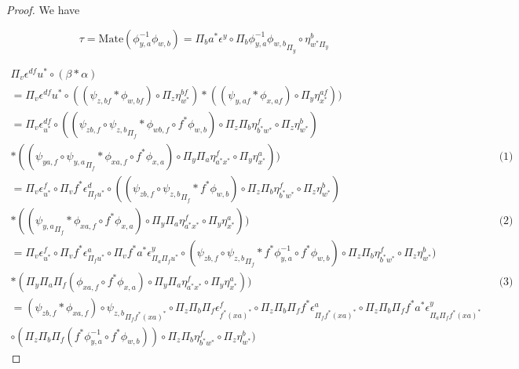 \documentclass[10pt, oneside]{article}
\begin{document}
\begin{proof}
    We have

    $$\tau = \mathrm{Mate}(\phi_{y, a}^{-1} \phi_{w, b}) = \Pi_b a^\ast \epsilon^y \circ \Pi_b {\phi_{y, a}^{-1} \phi_{w, b}}_{\Pi_y} \circ \eta^b_{w^\ast \Pi_y}$$

    \begin{align*}
        \Pi_v \epsilon^{df} u^\ast \circ (\beta \ast \alpha)
        \\ = \Pi_v \epsilon^{df} u^\ast \circ ((\psi_{z, bf} \ast \phi_{w, bf}) \circ \Pi_z \eta^{bf}_{w^\ast}) \ast ((\psi_{y, af} \ast \phi_{x, af}) \circ \Pi_y \eta^{af}_{x^\ast}))
        \\ = \Pi_v \epsilon^{df}_{u^\ast} \circ ((\psi_{zb, f} \circ {\psi_{z, b}}_{\Pi_f} \ast \phi_{wb, f} \circ f^\ast \phi_{w, b}) \circ \Pi_z \Pi_b \eta^f_{b^\ast w^\ast} \circ \Pi_z \eta^b_{w^\ast})
        \\ \ast ((\psi_{ya, f} \circ {\psi_{y, a}}_{\Pi_f} \ast \phi_{xa, f} \circ f^\ast \phi_{x, a}) \circ \Pi_y \Pi_a \eta^f_{a^\ast x^\ast} \circ \Pi_y \eta^{a}_{x^\ast})) && \text{(1)}
        \\ = \Pi_v \epsilon^f_{u^\ast} \circ \Pi_v f^\ast \epsilon^d_{\Pi_f u^\ast} \circ ((\psi_{zb, f} \circ {\psi_{z, b}}_{\Pi_f} \ast f^\ast \phi_{w, b}) \circ \Pi_z \Pi_b \eta^f_{b^\ast w^\ast} \circ \Pi_z \eta^b_{w^\ast})
        \\ \ast (({\psi_{y, a}}_{\Pi_f} \ast \phi_{xa, f} \circ f^\ast \phi_{x, a}) \circ \Pi_y \Pi_a \eta^f_{a^\ast x^\ast} \circ \Pi_y \eta^{a}_{x^\ast})) && \text{(2)}
        \\ = \Pi_v \epsilon^f_{u^\ast} \circ \Pi_v f^\ast \epsilon^a_{\Pi_f u^\ast} \circ \Pi_v f^\ast a^\ast \epsilon^y_{\Pi_ a\Pi_f u^\ast} \circ (\psi_{zb, f} \circ {\psi_{z, b}}_{\Pi_f} \ast f^\ast \phi^{-1}_{y, a} \circ f^\ast \phi_{w, b}) \circ \Pi_z \Pi_b \eta^f_{b^\ast w^\ast} \circ \Pi_z \eta^b_{w^\ast})
        \\ \ast (\Pi_y \Pi_a \Pi_f (\phi_{xa, f} \circ f^\ast \phi_{x, a}) \circ \Pi_y \Pi_a \eta^f_{a^\ast x^\ast} \circ \Pi_y \eta^{a}_{x^\ast})) && \text{(3)}
        \\ = (\psi_{zb, f} \ast \phi_{xa, f}) \circ {\psi_{z, b}}_{\Pi_f f^\ast (xa)^\ast} \circ \Pi_z \Pi_b \Pi_f \epsilon^f_{f^\ast (xa)^\ast} \circ \Pi_z \Pi_b \Pi_f f^\ast \epsilon^a_{\Pi_f f^\ast (xa)^\ast} \circ \Pi_z \Pi_b \Pi_f f^\ast a^\ast \epsilon^y_{\Pi_ a\Pi_f f^\ast (xa)^\ast} \\
        \circ (\Pi_z \Pi_b \Pi_f (f^\ast \phi^{-1}_{y, a} \circ f^\ast \phi_{w, b})) \circ \Pi_z \Pi_b \eta^f_{b^\ast w^\ast} \circ \Pi_z \eta^b_{w^\ast})

\end{align*}
\end{proof}
\end{document}
